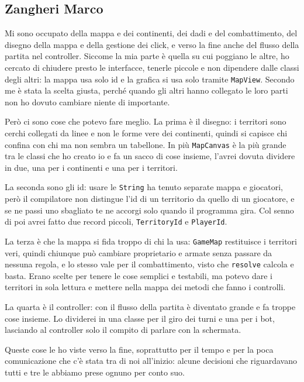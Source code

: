 \documentclass[a4paper,12pt]{report}
\begin{document}
\subsection{Zangheri Marco}
Mi sono occupato della mappa e dei continenti, dei dadi e del combattimento, del disegno della mappa e della gestione dei click, e verso la fine anche del flusso della partita nel controller. Siccome la mia parte è quella su cui poggiano le altre, ho cercato di chiudere presto le interfacce, tenerle piccole e non dipendere dalle classi degli altri: la mappa usa solo id e la grafica si usa solo tramite \texttt{MapView}. Secondo me è stata la scelta giusta, perché quando gli altri hanno collegato le loro parti non ho dovuto cambiare niente di importante.

Però ci sono cose che potevo fare meglio. La prima è il disegno: i territori sono cerchi collegati da linee e non le forme vere dei continenti, quindi si capisce chi confina con chi ma non sembra un tabellone. In più \texttt{MapCanvas} è la più grande tra le classi che ho creato io e fa un sacco di cose insieme, l'avrei dovuta dividere in due, una per i continenti e una per i territori.

La seconda sono gli id: usare le \texttt{String} ha tenuto separate mappa e giocatori, però il compilatore non distingue l'id di un territorio da quello di un giocatore, e se ne passi uno sbagliato te ne accorgi solo quando il programma gira. Col senno di poi avrei fatto due record piccoli, \texttt{TerritoryId} e \texttt{PlayerId}.

La terza è che la mappa si fida troppo di chi la usa: \texttt{GameMap} restituisce i territori veri, quindi chiunque può cambiare proprietario e armate senza passare da nessuna regola, e lo stesso vale per il combattimento, visto che \texttt{resolve} calcola e basta. Erano scelte per tenere le cose semplici e testabili, ma potevo dare i territori in sola lettura e mettere nella mappa dei metodi che fanno i controlli.

La quarta è il controller: con il flusso della partita è diventato grande e fa troppe cose insieme. Lo dividerei in una classe per il giro dei turni e una per i bot, lasciando al controller solo il compito di parlare con la schermata.

Queste cose le ho viste verso la fine, soprattutto per il tempo e per la poca comunicazione che c'è stata tra di noi all'inizio: alcune decisioni che riguardavano tutti e tre le abbiamo prese ognuno per conto suo.
\end{document}
